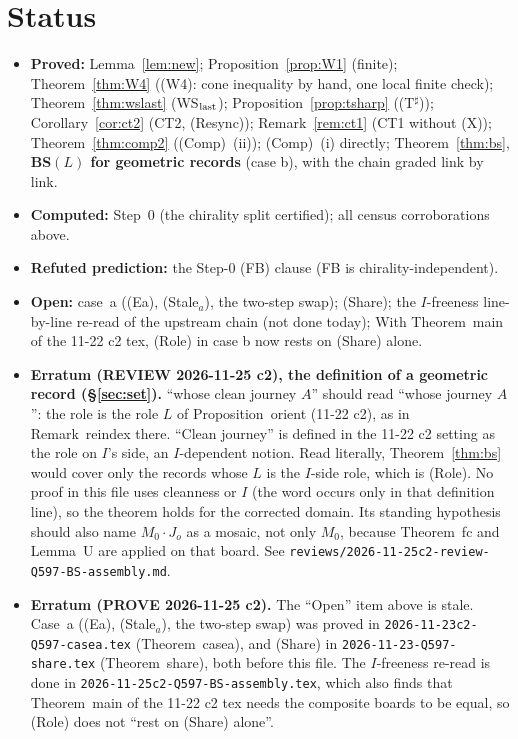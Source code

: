 \documentclass[11pt]{article}
\theoremstyle{definition}\newtheorem{definition}[theorem]{Definition}\newtheorem{remark}[theorem]{Remark}
\begin{document}
\section{Status}
\begin{itemize}
\item \textbf{Proved:} Lemma~\ref{lem:new}; Proposition~\ref{prop:W1} (finite); Theorem~\ref{thm:W4} ((W4): cone inequality by hand, one local finite check); Theorem~\ref{thm:wslast} (WS$_{\rm last}$); Proposition~\ref{prop:tsharp} ((T$^\sharp$)); Corollary~\ref{cor:ct2} (CT2, (Resync)); Remark~\ref{rem:ct1} (CT1 without (X)); Theorem~\ref{thm:comp2} ((Comp)~(ii)); (Comp)~(i) directly; Theorem~\ref{thm:bs}, \textbf{BS$(L)$ for geometric records} (case b), with the chain graded link by link.
\item \textbf{Computed:} Step~0 (the chirality split certified); all census corroborations above.
\item \textbf{Refuted prediction:} the Step-0 (FB) clause (FB is chirality-independent).
\item \textbf{Open:} case~a ((Ea), (Stale$_a$), the two-step swap); (Share); the $I$-freeness line-by-line re-read of the upstream chain (not done today); With Theorem~main of the 11-22 c2 tex, (Role) in case b now rests on (Share) alone.
\item \textbf{Erratum (REVIEW 2026-11-25 c2), the definition of a geometric record (\S\ref{sec:set}).} ``whose clean journey $A$'' should read ``whose journey $A$'': the role is the role $L$ of Proposition~orient (11-22 c2), as in Remark~reindex there. ``Clean journey'' is defined in the 11-22 c2 setting as the role on $I$'s side, an $I$-dependent notion. Read literally, Theorem~\ref{thm:bs} would cover only the records whose $L$ is the $I$-side role, which is (Role). No proof in this file uses cleanness or $I$ (the word occurs only in that definition line), so the theorem holds for the corrected domain. Its standing hypothesis should also name $M_0\cdot J_o$ as a mosaic, not only $M_0$, because Theorem~fc and Lemma~U are applied on that board. See \texttt{reviews/2026-11-25c2-review-Q597-BS-assembly.md}.
\item \textbf{Erratum (PROVE 2026-11-25 c2).} The ``Open'' item above is stale. Case~a ((Ea), (Stale$_a$), the two-step swap) was proved in \texttt{2026-11-23c2-Q597-casea.tex} (Theorem~casea), and (Share) in \texttt{2026-11-23-Q597-share.tex} (Theorem~share), both before this file. The $I$-freeness re-read is done in \texttt{2026-11-25c2-Q597-BS-assembly.tex}, which also finds that Theorem~main of the 11-22 c2 tex needs the composite boards to be equal, so (Role) does not ``rest on (Share) alone''.
\end{itemize}
\end{document}
